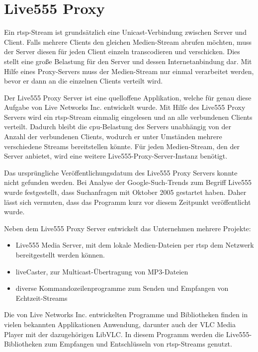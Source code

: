 
\section{Live555 Proxy}
Ein \ac{rtsp}-Stream ist grundsätzlich eine Unicast-Verbindung zwischen Server und Client.
Falls mehrere Clients den gleichen Medien-Stream abrufen möchten, muss der Server diesen für jeden Client einzeln transcodieren und verschicken.
Dies stellt eine große Belastung für den Server und dessen Internetanbindung dar.
Mit Hilfe eines Proxy-Servers muss der Medien-Stream nur einmal verarbeitet werden, bevor er dann an die einzelnen Clients verteilt wird.\par

Der Live555 Proxy Server ist eine quelloffene Applikation, welche für genau diese Aufgabe von Live Networks Inc. entwickelt wurde.
Mit Hilfe des Live555 Proxy Servers wird ein \ac{rtsp}-Stream einmalig eingelesen und an alle verbundenen Clients verteilt.
Dadurch bleibt die \ac{cpu}-Belastung des Servers unabhängig von der Anzahl der verbundenen Clients, wodurch er unter Umständen mehrere verschiedene Streams bereitstellen könnte. Für jeden Medien-Stream, den der Server anbietet, wird eine weitere Live555-Proxy-Server-Instanz benötigt.\par

Das ursprüngliche Veröffentlichungsdatum des Live555 Proxy Servers konnte nicht gefunden werden.
Bei Analyse der Google-Such-Trends zum Begriff Live555 wurde festgestellt, dass Suchanfragen mit Oktober 2005 gestartet haben.
Daher lässt sich vermuten, dass das Programm kurz vor diesem Zeitpunkt veröffentlicht wurde. \cite[vgl.][Interest over time]{live555-trends}

Neben dem Live555 Proxy Server entwickelt das Unternehmen mehrere Projekte:
\begin{itemize}
    \item Live555 Media Server, mit dem lokale Medien-Dateien per \ac{rtsp} dem Netzwerk bereitgestellt werden können.
    \item liveCaster, zur Multicast-Übertragung von MP3-Dateien
    \item diverse Kommandozeilenprogramme zum Senden und Empfangen von Echtzeit-Streams
\end{itemize}
Die von Live Networks Inc. entwickelten Programme und Bibliotheken finden in vielen bekannten Applikationen Anwendung, darunter auch der VLC Media Player mit der dazugehörigen LibVLC. In diesem Programm werden die Live555-Bibliotheken zum Empfangen und Entschlüsseln von \ac{rtsp}-Streams genutzt.